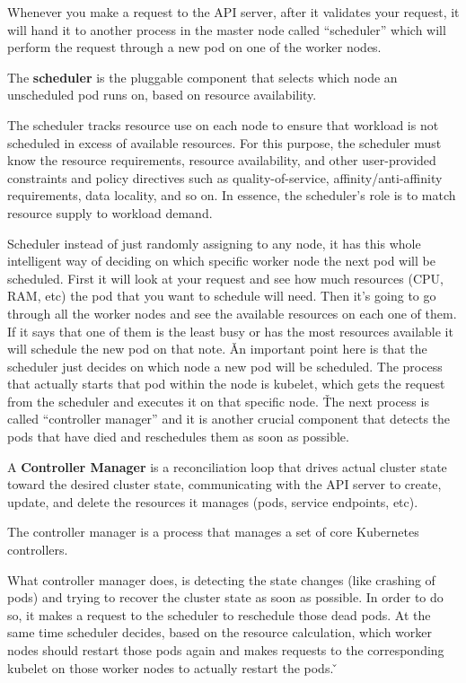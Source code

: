 Whenever you make a request to the API server, after it validates your request, it will hand it to another process in
the master node called ``scheduler'' which will perform the request through a new pod on one of the worker nodes.

\bd[Scheduler]
The \textbf{scheduler} is the pluggable component that selects which node an unscheduled pod runs on, based on resource
availability.
\ed

The scheduler tracks resource use on each node to ensure that workload is not scheduled in excess of available
resources. For this purpose, the scheduler must know the resource requirements, resource availability, and other
user-provided constraints and policy directives such as quality-of-service, affinity/anti-affinity
requirements, data locality, and so on. In essence, the scheduler's role is to match resource supply to workload demand.


Scheduler instead of just randomly assigning to any node, it has this whole intelligent way of deciding on which
specific worker node the next pod will be scheduled. First it will look at your request and see how much resources
(CPU, RAM, etc) the pod that you want to schedule will need. Then it's going to go through all the worker nodes and
see the available resources on each one of them. If it says that one of them is the least busy or has the most
resources available it will schedule the new pod on that note. \v

An important point here is that the scheduler just decides on which node a new pod will be scheduled. The process
that actually starts that pod within the node is kubelet, which gets the request from the scheduler and executes it
on that specific node. \v

The next process is called ``controller manager'' and it is another crucial component that detects the pods that have
died and reschedules them as soon as possible.

A \textbf{Controller Manager} is a reconciliation loop that drives actual cluster state toward the desired cluster
state, communicating with the API server to create, update, and delete the resources it manages (pods, service
endpoints, etc).
\ed

The controller manager is a process that manages a set of core Kubernetes controllers.


What controller manager does, is detecting the state changes (like crashing of pods) and trying to recover the
cluster state as soon as possible. In order to do so, it makes a request to the scheduler to reschedule those dead
pods. At the same time scheduler decides, based on the resource calculation, which worker nodes should restart those
pods again and makes requests to the corresponding kubelet on those worker nodes to actually restart the pods. \v

